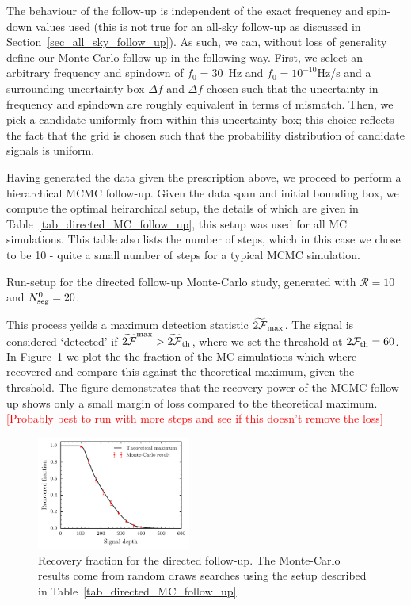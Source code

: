 \documentclass[aps, prd, twocolumn, superscriptaddress, floatfix, showpacs, nofootinbib, longbibliography]{revtex4-1}
\newcommand{\comment}[1]{\textcolor{red}{[#1]}}
\begin{document}
The behaviour of the follow-up is independent of the exact frequency and
spin-down values used (this is not true for an all-sky follow-up as discussed
in Section~\ref{sec_all_sky_follow_up}). As such, we can, without loss of
generality define our Monte-Carlo follow-up in the following way. First, we
select an arbitrary frequency and spindown of $f_0=30$~Hz and
$\dot{f}_0=10^{-10}$Hz/s and a surrounding uncertainty box $\Delta f$ and
$\Delta \dot{f}$ chosen such that the uncertainty in frequency and spindown are
roughly equivalent in terms of mismatch. Then, we pick a candidate uniformly
from within this uncertainty box; this choice reflects the fact that the grid
is chosen such that the probability distribution of candidate signals is
uniform.

Having generated the data given the prescription above, we proceed to perform a
hierarchical MCMC follow-up. Given the data span and initial bounding box, we
compute the optimal heirarchical setup, the details of which are given in
Table~\ref{tab_directed_MC_follow_up}, this setup was used for all MC
simulations. This table also lists the number of steps, which in this case we
chose to be 10 - quite a small number of steps for a typical MCMC simulation.

\begin{table}[htb]
\caption{Run-setup for the directed follow-up Monte-Carlo study, generated with
$\mathcal{R}=10$ and $N_{\rm seg}^0=20$.}
\label{tab_directed_MC_follow_up}

\end{table}

This process yeilds a maximum detection statistic $\widetilde{2{\mathcal{F}}}_{\rm max}$.
The signal is considered `detected' if $\widetilde{2{\mathcal{F}}}^{\rm max} >
\widetilde{2{\mathcal{F}}}_{\rm th}$, where we set the threshold at $2{\mathcal{F}}_{\rm th}=60$. In
Figure~\ref{fig_directed_MC_follow_up} we plot the the fraction of the MC
simulations which where recovered and compare this against the theoretical
maximum, given the threshold. The figure demonstrates that the recovery power
of the MCMC follow-up shows only a small margin of loss compared to the
theoretical maximum. \comment{Probably best to run with more steps and see if
this doesn't remove the loss}
\begin{figure}[htb]
\centering
\includegraphics[width=0.45\textwidth]{directed_recovery}
\caption{Recovery fraction for the directed follow-up. The Monte-Carlo results
come from random draws searches using the setup described in
Table~\ref{tab_directed_MC_follow_up}.}
\label{fig_directed_MC_follow_up}
\end{figure}
\end{document}
